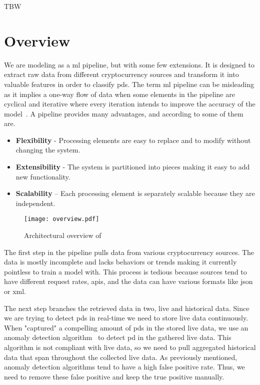 
TBW
\section{Overview}
We are modeling \project as a \ac{ml} pipeline, but with some few extensions. It is designed to extract raw data from different cryptocurrency sources and transform it into valuable features in order to classify \acp{pd}. The term \ac{ml} pipeline can be misleading as it implies a one-way flow of data when some elements in the pipeline are cyclical and iterative where every iteration intends to improve the accuracy of the model~\cite{ml_pipeline_3}. A pipeline provides many advantages, and according to \cite{ml_pipeline_2} some of them are.

\begin{itemize}
    \item \textbf{Flexibility} - Processing elements are easy to replace and to modify without changing the system.
    \item \textbf{Extensibility} - The system is partitioned into pieces making it easy to add new functionality.
    \item \textbf{Scalability} – Each processing element is separately scalable because they are independent.
\end{itemize}

\begin{figure}[ht]
    \centering
    \texttt{[image: overview.pdf]}
    \caption{Architectural overview of \project}
    \label{fig:overview}
\end{figure}

The first step in the pipeline pulls data from various cryptocurrency sources. The data is mostly incomplete and lacks behaviors or trends making it currently pointless to train a model with. This process is tedious because sources tend to have different request rates, \acp{api}, and the data can have various formats like \ac{json} or \ac{xml}.

The next step branches the retrieved data in two, live and historical data. Since we are trying to detect \acp{pd} in real-time we need to store live data continuously. When "captured" a compelling amount of \acp{pd} in the stored live data, we use an anomaly detection algorithm~\cite{P&D_to_the_moon} to detect \ac{pd} in the gathered live data. This algorithm is not compliant with live data, so we need to pull aggregated historical data that span throughout the collected live data. As previously mentioned, anomaly detection algorithms tend to have a high false positive rate. Thus, we need to remove these false positive and keep the true positive manually.

